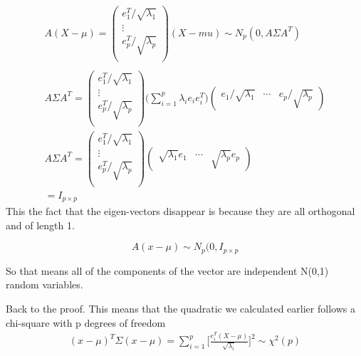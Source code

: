 \begin{gather*}
    A(X-\mu)= \begin{pmatrix}
e_1^T/\sqrt{\lambda_1} \\
\vdots \\
e_p^T/\sqrt{\lambda_p} \\
\end{pmatrix}(X-mu)\sim N_p(0,A\Sigma A^T)\\ \\
A\Sigma A^T = 
\begin{pmatrix}
e_1^T/\sqrt{\lambda_1} \\
\vdots \\
e_p^T/\sqrt{\lambda_p} \\
\end{pmatrix}
\Bigg(
\displaystyle\sum_{i=1}^p \lambda_i e_i e_i^T
\Bigg)
\begin{pmatrix}
e_1/\sqrt{\lambda_1} &
\cdots &
e_p/\sqrt{\lambda_p}
\end{pmatrix} \\
A\Sigma A^T = 
\begin{pmatrix}
e_1^T/\sqrt{\lambda_1} \\
\vdots \\
e_p^T/\sqrt{\lambda_p} \\
\end{pmatrix}
\begin{pmatrix}
\sqrt{\lambda_1} e_1&
\cdots &
\sqrt{\lambda_p}e_p
\end{pmatrix}\\
= I_{p \times p}
\end{gather*}
This the fact that the eigen-vectors disappear is because they are all orthogonal and of length 1.

\[A(x-\mu) \sim N_p(0,I_{p \times p}\]

So that means all of the components of the vector are independent N(0,1) random variables.

Back to the proof.
This means that the quadratic we calculated earlier follows a chi-square with p degrees of freedom
\begin{gather*}
    (x-\mu)^T\Sigma(x-\mu) = \sum_{i=1}^{p}\bigg[\frac{e_i^T(X-\mu)}{\sqrt{\lambda_i}}\bigg]^2 \sim \chi^2(p)
\end{gather*}